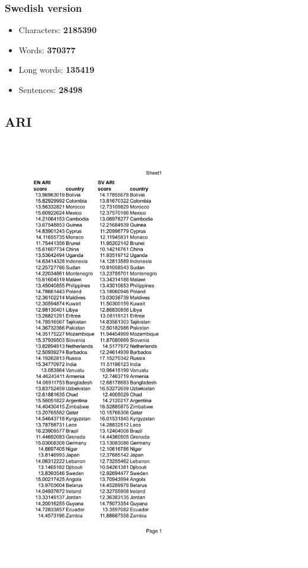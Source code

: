 \documentclass[a4paper]{article}
\begin{document}
\subsubsection{Swedish version}
\begin{itemize}
	\item Characters: \textbf{2185390}
	\item Words: \textbf{370377}
	\item Long words: \textbf{135419}
	\item Sentences: \textbf{28498}
\end{itemize}

\subsection{ARI}
\includegraphics[page=1,scale=0.75]{ARI.pdf}
\end{document}
